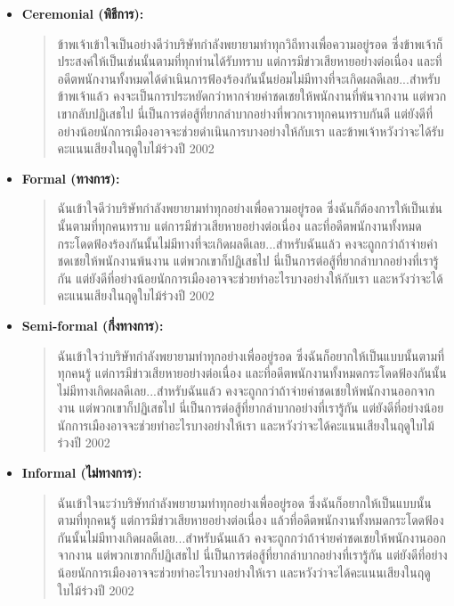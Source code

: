 \begin{itemize}
    \item \textbf{Ceremonial (พิธีการ):}
    \begin{quote}
        ข้าพเจ้าเข้าใจเป็นอย่างดีว่าบริษัทกำลังพยายามทำทุกวิถีทางเพื่อความอยู่รอด ซึ่งข้าพเจ้าก็ประสงค์ให้เป็นเช่นนั้นตามที่ทุกท่านได้รับทราบ แต่การมีข่าวเสียหายอย่างต่อเนื่อง และที่อดีตพนักงานทั้งหมดได้ดำเนินการฟ้องร้องกันนั้นย่อมไม่มีทางที่จะเกิดผลดีเลย...สำหรับข้าพเจ้าแล้ว คงจะเป็นการประหยัดกว่าหากจ่ายค่าชดเชยให้พนักงานที่พ้นจากงาน แต่พวกเขากลับปฏิเสธไป
        นี่เป็นการต่อสู้ที่ยากลำบากอย่างที่พวกเราทุกคนทราบกันดี แต่ยังดีที่อย่างน้อยนักการเมืองอาจจะช่วยดำเนินการบางอย่างให้กับเรา และข้าพเจ้าหวังว่าจะได้รับคะแนนเสียงในฤดูใบไม้ร่วงปี 2002
    \end{quote}

    \item \textbf{Formal (ทางการ):}
    \begin{quote}
        ฉันเข้าใจดีว่าบริษัทกำลังพยายามทำทุกอย่างเพื่อความอยู่รอด ซึ่งฉันก็ต้องการให้เป็นเช่นนั้นตามที่ทุกคนทราบ แต่การมีข่าวเสียหายอย่างต่อเนื่อง และที่อดีตพนักงานทั้งหมดกระโดดฟ้องร้องกันนั้นไม่มีทางที่จะเกิดผลดีเลย...สำหรับฉันแล้ว คงจะถูกกว่าถ้าจ่ายค่าชดเชยให้พนักงานพ้นงาน แต่พวกเขาก็ปฏิเสธไป
        นี่เป็นการต่อสู้ที่ยากลำบากอย่างที่เรารู้กัน แต่ยังดีที่อย่างน้อยนักการเมืองอาจจะช่วยทำอะไรบางอย่างให้กับเรา และหวังว่าจะได้คะแนนเสียงในฤดูใบไม้ร่วงปี 2002
    \end{quote}

    \item \textbf{Semi-formal (กึ่งทางการ):}
    \begin{quote}
        ฉันเข้าใจว่าบริษัทกำลังพยายามทำทุกอย่างเพื่ออยู่รอด ซึ่งฉันก็อยากให้เป็นแบบนั้นตามที่ทุกคนรู้ แต่การมีข่าวเสียหายอย่างต่อเนื่อง และที่อดีตพนักงานทั้งหมดกระโดดฟ้องกันนั้นไม่มีทางเกิดผลดีเลย...สำหรับฉันแล้ว คงจะถูกกว่าถ้าจ่ายค่าชดเชยให้พนักงานออกจากงาน แต่พวกเขาก็ปฏิเสธไป
        นี่เป็นการต่อสู้ที่ยากลำบากอย่างที่เรารู้กัน แต่ยังดีที่อย่างน้อยนักการเมืองอาจจะช่วยทำอะไรบางอย่างให้เรา และหวังว่าจะได้คะแนนเสียงในฤดูใบไม้ร่วงปี 2002
    \end{quote}

    \item \textbf{Informal (ไม่ทางการ):}
    \begin{quote}
        ฉันเข้าใจนะว่าบริษัทกำลังพยายามทำทุกอย่างเพื่ออยู่รอด ซึ่งฉันก็อยากให้เป็นแบบนั้นตามที่ทุกคนรู้ แต่การมีข่าวเสียหายอย่างต่อเนื่อง แล้วที่อดีตพนักงานทั้งหมดกระโดดฟ้องกันนั้นไม่มีทางเกิดผลดีเลย...สำหรับฉันแล้ว คงจะถูกกว่าถ้าจ่ายค่าชดเชยให้พนักงานออกจากงาน แต่พวกเขากก็ปฏิเสธไป
        นี่เป็นการต่อสู้ที่ยากลำบากอย่างที่เรารู้กัน แต่ยังดีที่อย่างน้อยนักการเมืองอาจจะช่วยทำอะไรบางอย่างให้เรา และหวังว่าจะได้คะแนนเสียงในฤดูใบไม้ร่วงปี 2002
    \end{quote}


\end{itemize}
